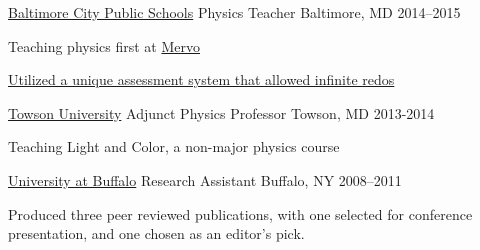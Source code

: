 \begin{cventries}
\cventry
    {\href{http://www.baltimorecityschools.org/}{Baltimore City Public Schools}}
    {Physics Teacher}
    {Baltimore, MD} {2014--2015}
    {
    \begin{cvitems}
      \item {Teaching physics first at \href{http://mervo.org}{Mervo}}
      \item {\href{https://github.com/jphafner/physicsAMC}{Utilized a unique assessment system that allowed infinite redos}}
    \end{cvitems}
    }

\cventry
    {\href{www.towson.edu}{Towson University}}
    {Adjunct Physics Professor}
    {Towson, MD} {2013-2014}
    {
    \begin{cvitems}
        \item Teaching Light and Color, a non-major physics course
    \end{cvitems}
    }




  \cventry
    {\href{www.buffalo.edu}{University at Buffalo}}
    {Research Assistant}
    {Buffalo, NY} {2008--2011}
    {
    \begin{cvitems}
	  \item {Produced three peer reviewed publications,
          with one selected for conference presentation,
          and one chosen as an editor's pick.}
    \end{cvitems}
    }


\end{cventries}


